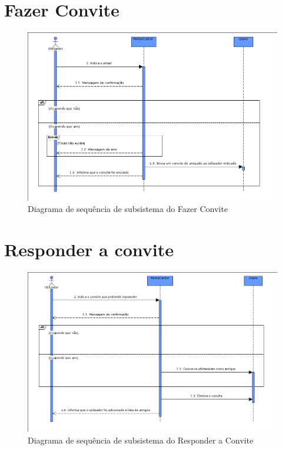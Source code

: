 \documentclass[a4paper]{report}
\begin{document}
\section{Fazer Convite}

\begin{figure}[H]
	\centering 
    \includegraphics[width=\textwidth]{images/fazerconviteSub.png}  
    \caption{Diagrama de sequência de subsistema do Fazer Convite}
\end{figure}

\section{Responder a convite}

\begin{figure}[H]
	\centering 
    \includegraphics[width=\textwidth]{images/respconviteSub.png}  
    \caption{Diagrama de sequência de subsistema do Responder a Convite}
\end{figure}
\end{document}

